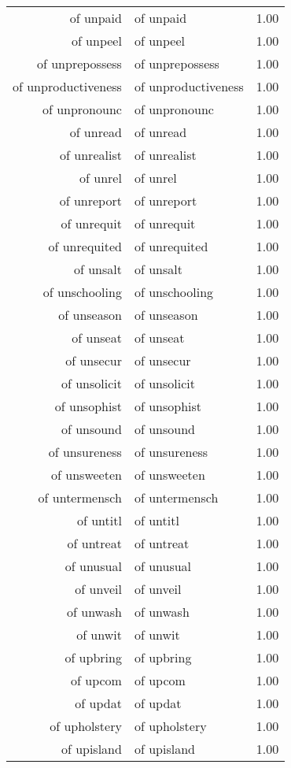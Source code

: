 \begin{table}[ht]
\begin{tabular}{rlr}
  of unpaid & of unpaid & 1.00 \\ 
  of unpeel & of unpeel & 1.00 \\ 
  of unprepossess & of unprepossess & 1.00 \\ 
  of unproductiveness & of unproductiveness & 1.00 \\ 
  of unpronounc & of unpronounc & 1.00 \\ 
  of unread & of unread & 1.00 \\ 
  of unrealist & of unrealist & 1.00 \\ 
  of unrel & of unrel & 1.00 \\ 
  of unreport & of unreport & 1.00 \\ 
  of unrequit & of unrequit & 1.00 \\ 
  of unrequited & of unrequited & 1.00 \\ 
  of unsalt & of unsalt & 1.00 \\ 
  of unschooling & of unschooling & 1.00 \\ 
  of unseason & of unseason & 1.00 \\ 
  of unseat & of unseat & 1.00 \\ 
  of unsecur & of unsecur & 1.00 \\ 
  of unsolicit & of unsolicit & 1.00 \\ 
  of unsophist & of unsophist & 1.00 \\ 
  of unsound & of unsound & 1.00 \\ 
  of unsureness & of unsureness & 1.00 \\ 
  of unsweeten & of unsweeten & 1.00 \\ 
  of untermensch & of untermensch & 1.00 \\ 
  of untitl & of untitl & 1.00 \\ 
  of untreat & of untreat & 1.00 \\ 
  of unusual & of unusual & 1.00 \\ 
  of unveil & of unveil & 1.00 \\ 
  of unwash & of unwash & 1.00 \\ 
  of unwit & of unwit & 1.00 \\ 
  of upbring & of upbring & 1.00 \\ 
  of upcom & of upcom & 1.00 \\ 
  of updat & of updat & 1.00 \\ 
  of upholstery & of upholstery & 1.00 \\ 
  of upisland & of upisland & 1.00 \\ 

\end{tabular}
\end{table}
